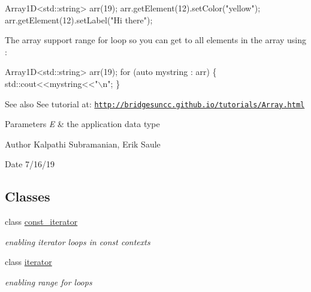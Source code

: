 \begin{DoxyCode}
Array1D<std::string> arr(19);
arr.getElement(12).setColor(\textcolor{stringliteral}{"yellow"});
arr.getElement(12).setLabel(\textcolor{stringliteral}{"Hi there"});
\end{DoxyCode}


The array support range for loop so you can get to all elements in the array using \+:


\begin{DoxyCode}
Array1D<std::string> arr(19);
\textcolor{keywordflow}{for} (\textcolor{keyword}{auto} mystring : arr) \{
  std::cout<<mystring<<\textcolor{stringliteral}{"\(\backslash\)n"};
\}
\end{DoxyCode}


\begin{DoxySeeAlso}{See also}
See tutorial at\+: \href{http://bridgesuncc.github.io/tutorials/Array.html}{\tt http\+://bridgesuncc.\+github.\+io/tutorials/\+Array.\+html}
\end{DoxySeeAlso}

\begin{DoxyParams}{Parameters}
{\em E} & the application data type \\
\hline
\end{DoxyParams}
\begin{DoxyAuthor}{Author}
Kalpathi Subramanian, Erik Saule 
\end{DoxyAuthor}
\begin{DoxyDate}{Date}
7/16/19 
\end{DoxyDate}
\subsection*{Classes}
\begin{DoxyCompactItemize}
\item 
class \mbox{\hyperlink{classbridges_1_1datastructure_1_1_array1_d_1_1const__iterator}{const\+\_\+iterator}}
\begin{DoxyCompactList}\small\item\em enabling iterator loops in const contexts \end{DoxyCompactList}\item 
class \mbox{\hyperlink{classbridges_1_1datastructure_1_1_array1_d_1_1iterator}{iterator}}
\begin{DoxyCompactList}\small\item\em enabling range for loops \end{DoxyCompactList}\end{DoxyCompactItemize}

